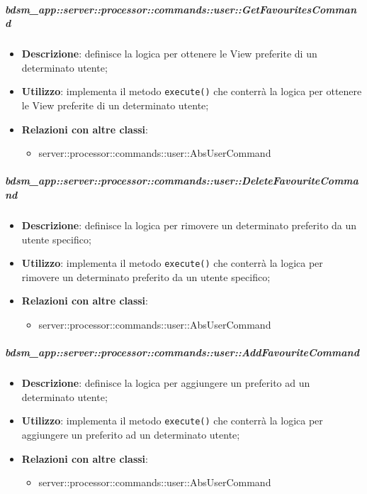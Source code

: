         \subparagraph{bdsm\_app::server::processor::commands::user::GetFavouritesCommand} %
        \label{subp:bdsm_app_server_processor_commands_user_getfavouritescommand}
        \begin{itemize}
          \item \textbf{Descrizione}: definisce la logica per ottenere le View preferite di un determinato utente;
          \item \textbf{Utilizzo}: implementa il metodo \texttt{execute()} che conterrà la logica per ottenere le View preferite di un determinato utente;
          \item \textbf{Relazioni con altre classi}:
            \begin{itemize}
              \item server::processor::commands::user::AbsUserCommand
            \end{itemize}
        \end{itemize}

        \subparagraph{bdsm\_app::server::processor::commands::user::DeleteFavouriteCommand} %
        \label{subp:bdsm_app_server_processor_commands_user_deletefavouritecommand}
        \begin{itemize}
          \item \textbf{Descrizione}: definisce la logica per rimovere un determinato preferito da un utente specifico;
          \item \textbf{Utilizzo}: implementa il metodo \texttt{execute()} che conterrà la logica per rimovere un determinato preferito da un utente specifico;
          \item \textbf{Relazioni con altre classi}:
            \begin{itemize}
              \item server::processor::commands::user::AbsUserCommand
            \end{itemize}
        \end{itemize}

        \subparagraph{bdsm\_app::server::processor::commands::user::AddFavouriteCommand} %
        \label{subp:bdsm_app_server_processor_commands_user_addfavouritecommand}
        \begin{itemize}
          \item \textbf{Descrizione}: definisce la logica per aggiungere un preferito ad un determinato utente;
          \item \textbf{Utilizzo}: implementa il metodo \texttt{execute()} che conterrà la logica per aggiungere un preferito ad un determinato utente;
          \item \textbf{Relazioni con altre classi}:
            \begin{itemize}
              \item server::processor::commands::user::AbsUserCommand
            \end{itemize}
        \end{itemize}


